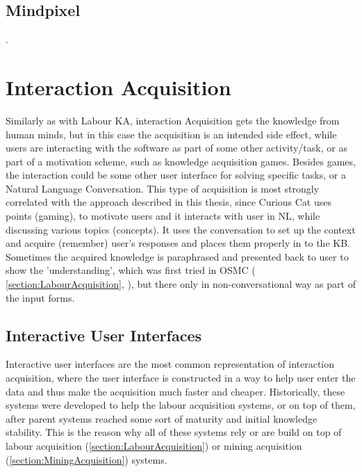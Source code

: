 \subsection{Mindpixel}. 
 
\section{Interaction Acquisition}
Similarly as with Labour KA, interaction Acquisition gets the knowledge from 
human minds, but in this case the acquisition is an intended side effect, while
users are interacting with the software as part of some other activity/task, or
as part of a motivation scheme, such as knowledge acquisition games. Besides 
games, the interaction could be some other user interface for solving specific
tasks, or a Natural Language Conversation. This type of acquisition is most 
strongly correlated with the approach described in this thesis, since Curious 
Cat uses points (gaming), to motivate users and it interacts with user in NL, 
while discussing various topics (concepts). It uses the conversation to set up
the context and acquire (remember) user's responses and places them properly in
to the KB. Sometimes the acquired knowledge is paraphrased and presented back to
user to show the 'understanding', which was first tried in OSMC (
\autoref{section:LabourAcquisition}, \parencite{Singh2002b}), but there only in
non-conversational way as part of the input forms.
 
\subsection{Interactive User Interfaces}
Interactive user interfaces are the most common representation of interaction 
acquisition, where the user interface is constructed in a way to help user enter
the data and thus make the acquisition much faster and cheaper. Historically, 
these systems were developed to help the labour acquisition systems, or on top
of them, after parent systems reached some sort of maturity and initial 
knowledge stability. This is the reason why all of these systems rely or are 
build on top of labour acquisition (\autoref{section:LabourAcquisition}) or 
mining acquisition (\autoref{section:MiningAcquisition}) systems.

